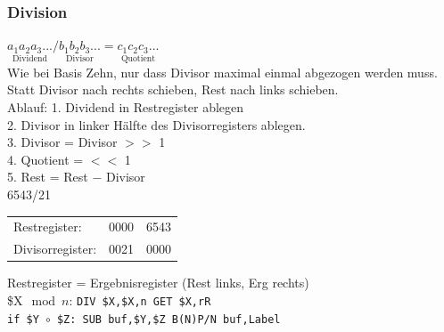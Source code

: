 \documentclass[fs]{latex4ei}
\begin{document}
\begin{multicols}{4}
		\subsubsection{Division}
		$\underset{\text {Dividend}}{a_1 a_2 a_3 ...} / \underset{\text {Divisor}}{b_1 b_2 b_3 ...} = \underset{\text {Quotient}}{c_1 c_2 c_3 ...}$\\
		Wie bei Basis Zehn, nur dass Divisor maximal einmal abgezogen werden muss.
		Statt Divisor nach rechts schieben, Rest nach links schieben.\\

		Ablauf: 
		1. Dividend in Restregister ablegen\\
		2. Divisor in linker Hälfte des Divisorregisters ablegen.\\
		3. Divisor = Divisor $>>$ 1\\
		4. Quotient = $<<$ 1\\
		5. Rest = Rest $-$ Divisor\\
		
		6543/21
		\begin{tabular}{ll|l}
		Restregister: & 0000 & 6543\\
		Divisorregister: & 0021 & 0000\\
		\end{tabular}
		Restregister = Ergebnisregister (Rest links, Erg rechts)\\
		
		\$X$\mod n$: {\tt DIV \$X,\$X,n \qquad GET \$X,rR}\\
		\texttt{if \$Y $\circ$ \$Z: SUB buf,\$Y,\$Z \qquad B(N)P/N buf,Label}\\
		
		

\end{multicols}
\end{document}
